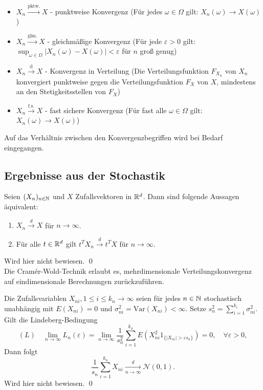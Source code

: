 \begin{itemize}
    \item $X_n \xrightarrow{\mathrm{pktw.}} X$ - punktweise Konvergenz (Für jedes $\omega \in \Omega$ gilt: $X_n(\omega) \to X(\omega)$)
    \item $X_n \xrightarrow{\mathrm{glm.}} X$ - gleichmäßige Konvergenz (Für jede $\varepsilon > 0$ gilt: $\sup_{\omega \in \Omega} |X_n(\omega) - X(\omega)| < \varepsilon$ für $n$ groß genug)
    \item $X_n \xrightarrow{\mathrm{d}} X$ - Konvergenz in Verteilung (Die Verteilungsfunktion $F_{X_n}$ von $X_n$ konvergiert punktweise gegen die Verteilungsfunktion $F_X$ von $X$, mindestens an den Stetigkeitsstellen von $F_X$)
    \item $X_n \xrightarrow{\mathrm{f.s.}} X$ - fast sichere Konvergenz (Für fast alle $\omega \in \Omega$ gilt: $X_n(\omega) \to X(\omega)$)
\end{itemize}

Auf das Verhältnis zwischen den Konvergenzbegriffen wird bei Bedarf eingegangen.

\subsection{Ergebnisse aus der Stochastik}

\begin{satz}\label{satz:cramer_wold}
Seien $(X_n)_{n \in \Bbb N}$ und $X$ Zufallsvektoren in $\Bbb R^d$. Dann sind folgende Aussagen äquivalent:
\begin{enumerate}
    \item $X_n \xrightarrow{d} X$ für $n \to \infty$.
    \item Für alle $t \in \Bbb R^d$ gilt $t^T X_n \xrightarrow{d} t^T X$ für $n \to \infty$.
\end{enumerate}
Wird hier nicht bewiesen. \qed \\
Die Cramér-Wold-Technik erlaubt es, mehrdimensionale Verteilungskonvergenz auf eindimensionale Berechnungen zurückzuführen.
\end{satz}

\begin{satz}\label{satz:lindeberg_feller}
Die Zufallsvariablen $X_{ni}, 1 \le i \le k_n \to \infty$ seien für jedes $n \in \Bbb N$ stochastisch unabhängig mit
$E(X_{ni})=0$ und $\sigma^2_{ni} = \text{Var}(X_{ni}) \lt \infty$.
Setze $s_n^2 = \sum_{i=1}^{k_i} \sigma_{ni}^2$. Gilt die Lindeberg-Bedingung
$$(L) \quad \lim_{n \to \infty} L_n(\varepsilon) = \lim_{n \to \infty} \frac{1}{s_n^2} \sum_{i=1}^{k_n} E(X^2_{ni} 1_{\{\vert X_{ni} \vert \gt \varepsilon s_n\}})=0, \quad \forall \varepsilon \gt 0,$$
Dann folgt
$$\frac{1}{s_n} \sum_{i=1}^{k_n} X_{ni} \underset{n \to \infty}{\overset d \longrightarrow} \mathcal N(0,1).$$
Wird hier nicht bewiesen. \qed
\end{satz}

